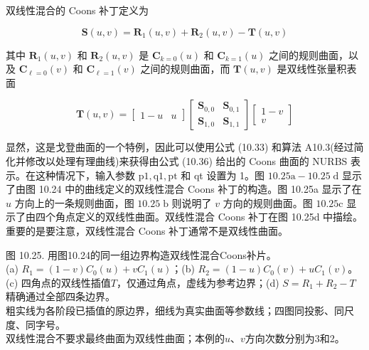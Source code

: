 \documentclass[../main.tex]{subfiles}
\begin{document}
双线性混合的 Coons 补丁定义为

\[
\mathbf{S}\left( {u,v}\right)  = {\mathbf{R}}_{1}\left( {u,v}\right)  + {\mathbf{R}}_{2}\left( {u,v}\right)  - \mathbf{T}\left( {u,v}\right)  \tag{10.36}
\]

其中 \({\mathbf{R}}_{1}\left( {u,v}\right)\) 和 \({\mathbf{R}}_{2}\left( {u,v}\right)\) 是 \({\mathbf{C}}_{k = 0}\left( u\right)\) 和 \({\mathbf{C}}_{k = 1}\left( u\right)\) 之间的规则曲面，以及 \({\mathbf{C}}_{\ell  = 0}\left( v\right)\) 和 \({\mathbf{C}}_{\ell  = 1}\left( v\right)\) 之间的规则曲面，而 \(\mathbf{T}\left( {u,v}\right)\) 是双线性张量积表面

\[
\mathbf{T}\left( {u,v}\right)  = \left\lbrack  \begin{array}{ll} 1-u & u \end{array}\right\rbrack  \left\lbrack  \begin{array}{ll} {\mathbf{S}}_{0,0} & {\mathbf{S}}_{0,1} \\  {\mathbf{S}}_{1,0} & {\mathbf{S}}_{1,1} \end{array}\right\rbrack  \left\lbrack  \begin{array}{l} 1-v \\  v \end{array}\right\rbrack
\]



显然，这是戈登曲面的一个特例，因此可以使用公式 (10.33) 和算法 A10.3(经过简化并修改以处理有理曲线)来获得由公式 (10.36) 给出的 Coons 曲面的 NURBS 表示。在这种情况下，输入参数 \(\mathrm{p}1,\mathrm{q}1,\mathrm{{pt}}\) 和 qt 设置为 1。图 \({10.25}\mathrm{a} - {10.25}\mathrm{\;d}\) 显示了由图 10.24 中的曲线定义的双线性混合 Coons 补丁的构造。图 10.25a 显示了在 \(u\) 方向上的一条规则曲面，图 \({10.25}\mathrm{\;b}\) 则说明了 \(v\) 方向的规则曲面。图 \({10.25}\mathrm{c}\) 显示了由四个角点定义的双线性曲面。双线性混合 Coons 补丁在图 10.25d 中描绘。重要的是要注意，双线性混合 Coons 补丁通常不是双线性曲面。

\begin{center}
\begin{minipage}{37cm}
\vspace*{.6\baselineskip}
\centering
{}\par\vspace{.5cm}
\hspace{1cm}
\par\smallskip
图 10.25. 用图10.24的同一组边界构造双线性混合Coons补片。\\
(a) $R_1=(1-v)C_0(u)+vC_1(u)$；(b) $R_2=(1-u)C_0(v)+uC_1(v)$。\\
(c) 四角点的双线性插值$T$，仅通过角点，虚线为参考边界；(d) $S=R_1+R_2-T$精确通过全部四条边界。\\
粗实线为各阶段已插值的原边界，细线为真实曲面等参数线；四图同投影、同尺度、同字号。\\
双线性混合不要求最终曲面为双线性曲面；本例的$u$、$v$方向次数分别为3和2。
\end{minipage}
\end{center}
\end{document}
